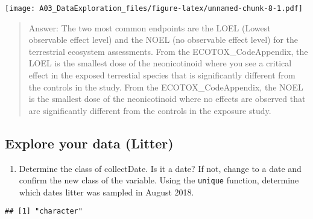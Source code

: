 \documentclass[
]{article}
\newenvironment{Shaded}{\begin{snugshade}}{\end{snugshade}}
\newcommand{\CommentTok}[1]{\textcolor[rgb]{0.56,0.35,0.01}{\textit{#1}}}
\newcommand{\FunctionTok}[1]{\textcolor[rgb]{0.00,0.00,0.00}{#1}}
\newcommand{\NormalTok}[1]{#1}
\newcommand{\OtherTok}[1]{\textcolor[rgb]{0.56,0.35,0.01}{#1}}
\newcommand{\SpecialCharTok}[1]{\textcolor[rgb]{0.00,0.00,0.00}{#1}}
\providecommand{\tightlist}{%
  \setlength{\itemsep}{0pt}\setlength{\parskip}{0pt}}
\begin{document}
\texttt{[image: A03\_DataExploration\_files/figure-latex/unnamed-chunk-8-1.pdf]}

\begin{quote}
Answer: The two most common endpoints are the LOEL (Lowest observable
effect level) and the NOEL (no observable effect level) for the
terrestrial ecosystem assessments. From the ECOTOX\_CodeAppendix, the
LOEL is the smallest dose of the neonicotinoid where you see a critical
effect in the exposed terrestial species that is significantly different
from the controls in the study. From the ECOTOX\_CodeAppendix, the NOEL
is the smallest dose of the neonicotinoid where no effects are observed
that are significantly different from the controls in the exposure
study.
\end{quote}

\hypertarget{explore-your-data-litter}{%
\subsection{Explore your data (Litter)}\label{explore-your-data-litter}}

\begin{enumerate}
\def\labelenumi{\arabic{enumi}.}
\setcounter{enumi}{11}
\tightlist
\item
  Determine the class of collectDate. Is it a date? If not, change to a
  date and confirm the new class of the variable. Using the
  \texttt{unique} function, determine which dates litter was sampled in
  August 2018.
\end{enumerate}

\begin{Shaded}
\end{Shaded}

\begin{verbatim}
## [1] "character"
\end{verbatim}

\begin{Shaded}
\end{Shaded}
\end{document}
